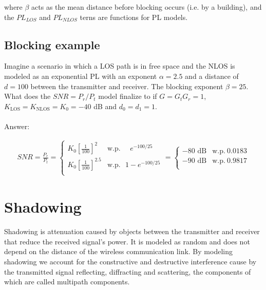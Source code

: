 \documentclass[12pt]{report} %
\begin{document}
where $\beta$ acts as the mean distance before blocking occurs (i.e. by a building), and the $PL_{LOS}$ and $PL_{NLOS}$ terns are functions for \gls{PL} models.
\begin{mdframed}

  \subsection*{Blocking example}
  Imagine a scenario in which a \gls{LOS} path is in free space and the \gls{NLOS}
  is modeled as an exponential \gls{PL} with an exponent $\alpha = 2.5$ and a
  distance of $d = 100$ between the transmitter and receiver. The blocking
  exponent $\beta = 25$. What does the $SNR = P_r/P_t$ model finalize to if $G =
    G_t G_r = 1$, $K_{\text{LOS}} = K_{\text{NLOS}} = K_0 = -40$ dB and $d_0 = d_1 =
    1$.
  \\
  \\
  Answer:

  \begin{align}
    SNR = \frac{P_r}{P_t} = \left\{ \begin{array}{ll}
                                      K_0 \left[\frac{1}{100}\right]^2     & \text{w.p.} ~~~~~~ e^{-100/25}  \\
                                      K_0 \left[\frac{1}{100}\right]^{2.5} & \text{w.p.} ~~~ 1 - e^{-100/25} \\
                                    \end{array}
    \right. \nonumber
    = \left\{ \begin{array}{ll}
                -80 \text{ dB} & \text{w.p.} ~ 0.0183 \\
                -90 \text{ dB} & \text{w.p.} ~ 0.9817 \\
              \end{array}
    \right. \nonumber
  \end{align}
\end{mdframed}

\section{Shadowing}
Shadowing is attenuation caused by objects between the transmitter and receiver
that reduce the received signal's power. It is modeled as random and does not
depend on the distance of the wireless communication link. By modeling shadowing
we account for the constructive and destructive interference cause by the
transmitted signal reflecting, diffracting and scattering, the components of
which are called multipath components.
\end{document}
